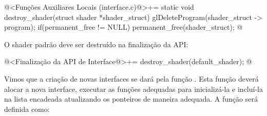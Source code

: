 \iniciocodigo
@<Funções Auxiliares Locais (interface.c)@>+=
static void destroy_shader(struct shader *shader_struct){
  glDeleteProgram(shader_struct -> program);
  if(permanent_free != NULL)
    permanent_free(shader_struct);
}
@
\fimcodigo

O shader padrão deve ser destruído na finalização da API:

\iniciocodigo
@<Finalização da API de Interface@>+=
destroy_shader(default_shader);
@
\fimcodigo


Vimos que a criação de novas interfaces se dará pela função
. Esta função deverá alocar a nova
interface, executar as funções adequadas para inicializá-la e
incluí-la na lista encadeada atualizando os ponteiros de maneira
adequada. A função será definida como:

